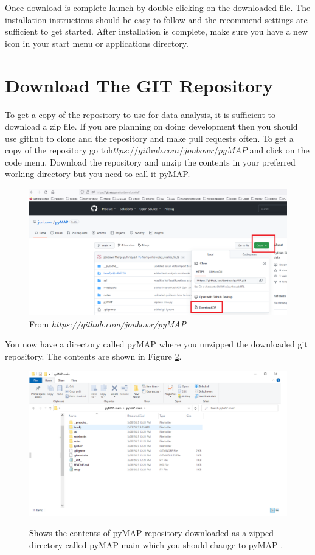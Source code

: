 \documentclass{article}
\begin{document}
Once download is complete launch by double clicking on the downloaded file. The installation instructions should be easy to follow and the recommend settings are sufficient to get started. After installation is complete, make sure you have a new icon in your start menu or applications directory.


\section{Download The GIT Repository}
\label{sec:git_inst}
To get a copy of the repository to use for data analysis, it is sufficient to download a zip file. If you are planning on doing development then you should use github to clone and the repository and make pull requests often. To get a copy of the repository go to$ \textit{https://github.com/jonbowr/pyMAP}$ and click on the code menu. Download the repository and unzip the contents in your preferred working directory but you need to call it pyMAP.

\begin{figure}[H]
\centering
\includegraphics[scale=0.4]{gitdown1.png}
\caption{From \textit{https://github.com/jonbowr/pyMAP}}
\label{fig:git_download1}
\end{figure}


You now have a directory called pyMAP where you unzipped the downloaded git repository. The contents are shown in Figure \ref{fig:git_download2}.


\begin{figure}[H]
\centering
\includegraphics[scale=0.4]{gitdown2.png}
\label{fig:git_download2}
\caption{ Shows the contents of pyMAP repository downloaded as a zipped directory called pyMAP-main which you should change to pyMAP .}
\end{figure}
\end{document}
